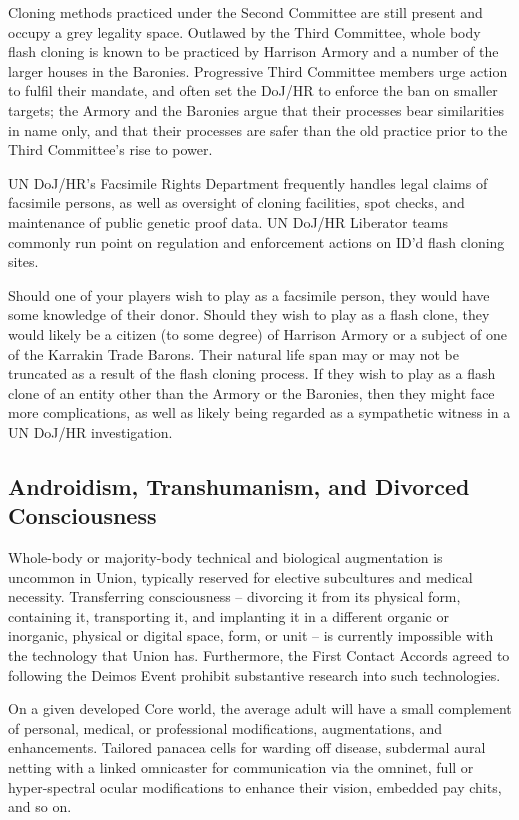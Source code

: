 Cloning methods practiced under the Second Committee are still present and occupy a grey
legality space. Outlawed by the Third Committee, whole body flash cloning is known to be
practiced by Harrison Armory and a number of the larger houses in the Baronies. Progressive
Third Committee members urge action to fulfil their mandate, and often set the DoJ/HR to
enforce the ban on smaller targets; the Armory and the Baronies argue that their processes bear
similarities in name only, and that their processes are safer than the old practice prior to the Third
Committee's rise to power.

UN DoJ/HR's Facsimile Rights Department frequently handles legal claims of facsimile persons,
as well as oversight of cloning facilities, spot checks, and maintenance of public genetic proof
data. UN DoJ/HR Liberator teams commonly run point on regulation and enforcement actions on
ID'd flash cloning sites.

Should one of your players wish to play as a facsimile person, they would have some knowledge
of their donor. Should they wish to play as a flash clone, they would likely be a citizen (to some
degree) of Harrison Armory or a subject of one of the Karrakin Trade Barons. Their natural life
span may or may not be truncated as a result of the flash cloning process. If they wish to play as
a flash clone of an entity other than the Armory or the Baronies, then they might face more
complications, as well as likely being regarded as a sympathetic witness in a UN DoJ/HR
investigation.

\subsection{Androidism, Transhumanism, and Divorced Consciousness}

Whole-body or majority-body technical and biological augmentation is uncommon in Union,
typically reserved for elective subcultures and medical necessity. Transferring consciousness --
divorcing it from its physical form, containing it, transporting it, and implanting it in a different
organic or inorganic, physical or digital space, form, or unit -- is currently impossible with the
technology that Union has. Furthermore, the First Contact Accords agreed to following the
Deimos Event prohibit substantive research into such technologies.

On a given developed Core world, the average adult will have a small complement of personal,
medical, or professional modifications, augmentations, and enhancements. Tailored panacea
cells for warding off disease, subdermal aural netting with a linked omnicaster for communication
via the omninet, full or hyper-spectral ocular modifications to enhance their vision, embedded
pay chits, and so on.

